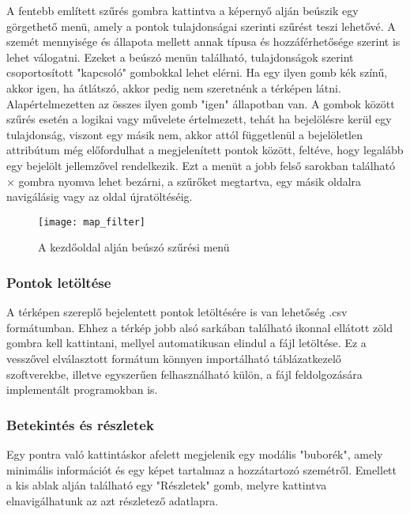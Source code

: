 A fentebb említett szűrés gombra kattintva a képernyő alján beúszik egy görgethető menü, amely a pontok tulajdonságai szerinti szűrést teszi lehetővé. A szemét mennyisége és állapota mellett annak típusa és hozzáférhetősége szerint is lehet válogatni. Ezeket a beúszó menün található, tulajdonságok szerint csoportosított "kapcsoló" gombokkal lehet elérni. Ha egy ilyen gomb kék színű, akkor igen, ha átlátszó, akkor pedig nem szeretnénk a térképen látni. Alapértelmezetten az összes ilyen gomb "igen" állapotban van. A gombok között szűrés esetén a logikai vagy művelete értelmezett, tehát ha bejelölésre kerül egy tulajdonság, viszont egy másik nem, akkor attól függetlenül a bejelöletlen attribútum még előfordulhat a megjelenített pontok között, feltéve, hogy legalább egy bejelölt jellemzővel rendelkezik. Ezt a menüt a jobb felső sarokban található \hspace{0.1cm}\boldmath\(\times\)\hspace{0.1cm} gombra nyomva lehet bezárni, a szűrőket megtartva, egy másik oldalra navigálásig vagy az oldal újratöltéséig.

\begin{figure}[H]
	\centering
	\texttt{[image: map\_filter]}
	\caption{A kezdőoldal alján beúszó szűrési menü}
	\label{fig:map_filter}
\end{figure}

\subsubsection{Pontok letöltése}

A térképen szereplő bejelentett pontok letöltésére is van lehetőség .csv formátumban. Ehhez a térkép jobb alsó sarkában található \hspace{0.1cm}\hspace{0.1cm} ikonnal ellátott zöld gombra kell kattintani, mellyel automatikusan elindul a fájl letöltése. Ez a vesszővel elválasztott formátum könnyen importálható táblázatkezelő szoftverekbe, illetve egyszerűen felhasználható külön, a fájl feldolgozására implementált programokban is.

\subsubsection{Betekintés és részletek}

Egy pontra való kattintáskor afelett megjelenik egy modális "buborék", amely minimális információt és egy képet tartalmaz a hozzátartozó szemétről. Emellett a kis ablak alján található egy "Részletek" gomb, melyre kattintva elnavigálhatunk az azt részletező adatlapra.

